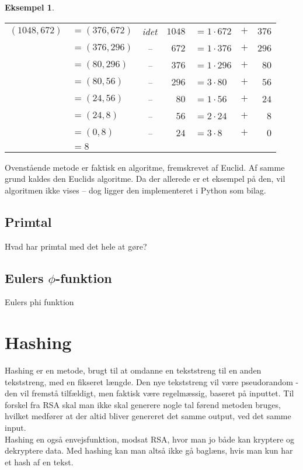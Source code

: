 \documentclass[a4paper, 12pt]{article}
\theoremstyle{break}
\newtheorem{eks}[definition]{Eksempel}
\theoremstyle{breakline}
\begin{document}
    \begin{eks}
        \begin{tabular*}{\textwidth}{r l c r l c r}
            \((1048, 672)\) & \(= (376, 672)\) & idet & \(1048\) & \(= 1 \cdot 672\) & \(+\) & \(376\)\\
            & \(= (376, 296)\) & -- & \(672\) & \(= 1 \cdot 376\) & \(+\) & \(296\)\\
            & \(= (80, 296)\) & -- & \(376\) & \(= 1 \cdot 296\) & \(+\) & \(80\)\\
            & \(= (80, 56)\) & -- & \(296\) & \(= 3 \cdot 80\) & \(+\) & \(56\)\\
            & \(= (24, 56)\) & -- & \(80\) & \(= 1 \cdot 56\) & \(+\) & \(24\)\\
            & \(= (24, 8)\) & -- & \(56\) & \(= 2 \cdot 24\) & \(+\) & \(8\)\\
            & \(= (0, 8)\) & -- & \(24\) & \(= 3 \cdot 8\) & \(+\) & \(0\)\\
            & \(= 8\) & & & & &
        \end{tabular*}
    \end{eks}

    Ovenstående metode er faktisk en algoritme, fremskrevet af Euclid. Af samme grund kaldes den Euclids algoritme.
    Da der allerede er et eksempel på den, vil algoritmen ikke vises -- dog ligger den implementeret i Python som bilag. %





    \subsection{Primtal}
    Hvad har primtal med det hele at gøre?

    \subsection{Eulers \texorpdfstring{\(\phi\)}{Lg}-funktion}
    Eulers phi funktion


\newpage
\section{Hashing}
Hashing er en metode, brugt til at omdanne en tekststreng til en anden tekststreng, med en fikseret længde.
Den nye tekststreng vil være pseudorandom - den vil fremstå tilfældigt, men faktisk være regelmæssig, baseret på inputtet.
Til forskel fra RSA skal man ikke skal generere nogle tal førend metoden bruges, hvilket medfører at der altid bliver genereret det samme output, ved det samme input.
\\
Hashing en også envejsfunktion, modsat RSA, hvor man jo både kan kryptere og dekryptere data.
Med hashing kan man altså ikke gå baglæns, hvis man kun har et hash af en tekst.
\end{document}
